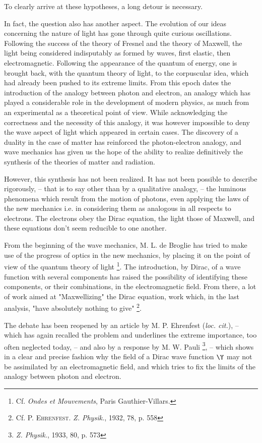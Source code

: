 \documentclass{article}
\renewcommand{\it}[1]{\textit{#1}}
\renewcommand{\sc}[1]{\textsc{#1}}
\begin{document}
\begin{multicols}{2}
To clearly arrive at these hypotheses, a long detour is necessary.

In fact, the question also has another aspect. The evolution of our ideas concerning the nature of light has gone through quite curious oscillations. Following the success of the theory of Fresnel and the theory of Maxwell, the light being considered indisputably as formed by waves, first elastic, then electromagnetic. Following the appearance of the quantum of energy, one is brought back, with the quantum theory of light, to the corpuscular idea, which had already been pushed to its extreme limits. From this epoch dates the introduction of the analogy between photon and electron, an analogy which has played a considerable role in the development of modern physics, as much from an experimental as a theoretical point of view. While acknowledging the correctness and the necessity of this analogy, it was however impossible to deny the wave aspect of light which appeared in certain cases. The discovery of a duality in the case of matter has reinforced the photon-electron analogy, and wave mechanics has given us the hope of the ability to realize definitively the synthesis of the theories of matter and radiation.

However, this synthesis has not been realized. It has not been possible to describe rigorously, -- that is to say other than by a qualitative analogy, -- the luminous phenomena which result from the motion of photons, even applying the laws of the new mechanics i.e. in considering them as analogous in all respects to electrons. The electrons obey the Dirac equation, the light those of Maxwell, and these equations don't seem reducible to one another.

From the beginning of the wave mechanics, M. L. de Broglie has tried to make use of the progress of optics in the new mechanics, by placing it on the point of view of the quantum theory of light \footnote{Cf. \it{Ondes et Mouvements}, Paris Gauthier-Villars.}. The introduction, by Dirac, of a wave function with several components has raised the possibility of identifying these components, or their combinations, in the electromagnetic field. From there, a lot of work aimed at "Maxwellizing" the Dirac equation, work which, in the last analysis, "have absolutely nothing to give" \footnote{Cf. \sc{P. Ehrenfest}. \it{Z. Physik.}, 1932, 78, p. 558}.

The debate has been reopened by an article by M. P. Ehrenfest (\it{loc. cit.}), -- which has again recalled the problem and underlines the extreme importance, too often neglected today, -- and also by a response by M. W. Pauli \footnote{\it{Z. Physik.}, 1933, 80, p. 573}, -- which shows in a clear and precise fashion why the field of a Dirac wave function $\Y$ may not be assimilated by an electromagnetic field, and which tries to fix the limits of the analogy between photon and electron.


\end{multicols}
\end{document}
